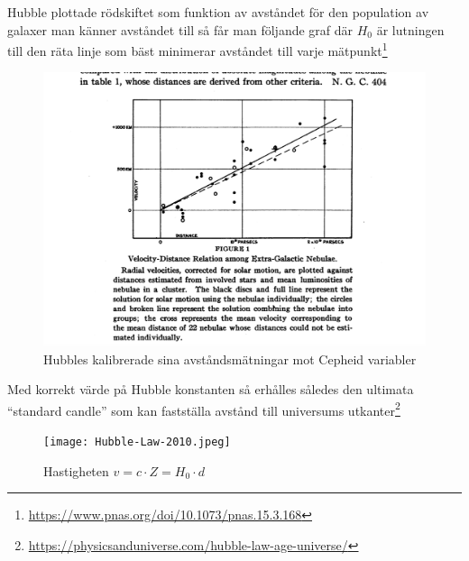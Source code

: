 \documentclass[./exercises.tex]{subfiles}
\begin{document}
Hubble plottade rödskiftet som funktion av avståndet för den population av galaxer man känner avståndet till
så får man följande graf där $H_0$ är lutningen till den räta linje som bäst minimerar avståndet till varje 
mätpunkt\footnote{\url{https://www.pnas.org/doi/10.1073/pnas.15.3.168}}
\begin{figure}[H]
\begin{center}
  \includegraphics[scale=0.2]{Hubble.png}
  \caption{Hubbles kalibrerade sina avståndsmätningar mot Cepheid variabler }
  \end{center}
  \label{fig4}
\end{figure}

Med korrekt värde på Hubble konstanten så erhålles således den ultimata ``standard candle'' som kan fastställa
avstånd till universums utkanter\footnote{\url{https://physicsanduniverse.com/hubble-law-age-universe/}}

\begin{figure}[H]
\begin{center}
  \texttt{[image: Hubble-Law-2010.jpeg]}
  \caption{Hastigheten $v=c\cdot Z=H_0\cdot d$ }
  \end{center}
  \label{fig4}
\end{figure}
\end{document}
